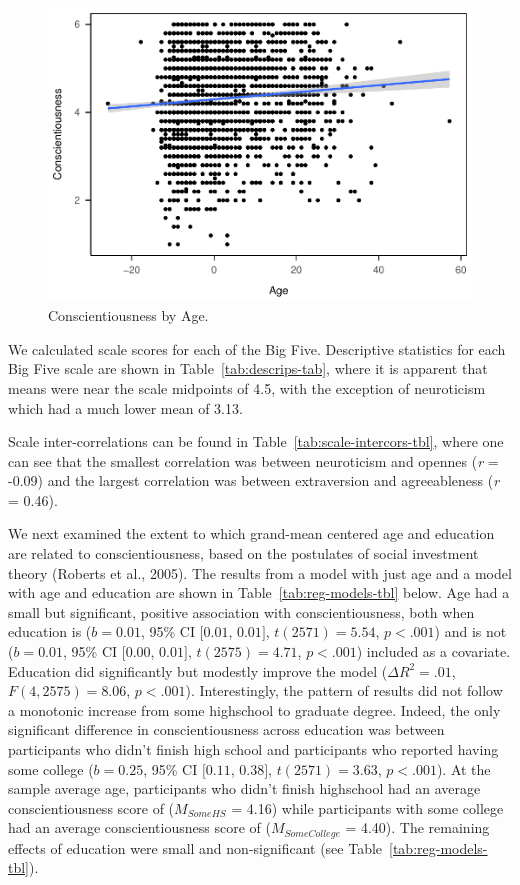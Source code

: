 \documentclass[
  english,
  man]{apa6}
\begin{document}
\begin{figure}
\centering
\includegraphics{papaja_example_ms_files/figure-latex/fig-ageXconsc-1.pdf}
\caption{\label{fig:fig-ageXconsc}Conscientiousness by Age.}
\end{figure}

We calculated scale scores for each of the Big Five. Descriptive statistics for each Big Five scale are shown in Table~\ref{tab:descrips-tab}, where it is apparent that means were near the scale midpoints of 4.5, with the exception of neuroticism which had a much lower mean of 3.13.

Scale inter-correlations can be found in Table~\ref{tab:scale-intercors-tbl}, where one can see that the smallest correlation was between neuroticism and opennes (\emph{r} = -0.09) and the largest correlation was between extraversion and agreeableness (\emph{r} = 0.46).

We next examined the extent to which grand-mean centered age and education are related to conscientiousness, based on the postulates of social investment theory (Roberts et al., 2005). The results from a model with just age and a model with age and education are shown in Table~\ref{tab:reg-models-tbl} below. Age had a small but significant, positive association with conscientiousness, both when education is (\(b = 0.01\), 95\% CI \([0.01\), \(0.01]\), \(t(2571) = 5.54\), \(p < .001\)) and is not (\(b = 0.01\), 95\% CI \([0.00\), \(0.01]\), \(t(2575) = 4.71\), \(p < .001\)) included as a covariate. Education did significantly but modestly improve the model (\(\Delta R^2 = .01\), \(F(4, 2575) = 8.06\), \(p < .001\)). Interestingly, the pattern of results did not follow a monotonic increase from some highschool to graduate degree. Indeed, the only significant difference in conscientiousness across education was between participants who didn't finish high school and participants who reported having some college (\(b = 0.25\), 95\% CI \([0.11\), \(0.38]\), \(t(2571) = 3.63\), \(p < .001\)). At the sample average age, participants who didn't finish highschool had an average conscientiousness score of (\(M_{SomeHS}\) = 4.16) while participants with some college had an average conscientiousness score of (\(M_{SomeCollege}\) = 4.40). The remaining effects of education were small and non-significant (see Table~\ref{tab:reg-models-tbl}).
\end{document}
